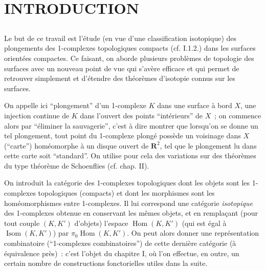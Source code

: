 

\chapter*{INTRODUCTION}
\section*{}

Le but de ce travail est l'étude (en vue d'une classification isotopique) des plongements des 1-complexes topologiques compacts (cf. I.1.2.) dans les surfaces orientées compactes. Ce faisant, on aborde plusieurs problèmes de topologie des surfaces avec un nouveau point de vue qui s'avère efficace et qui permet de retrouver simplement et d'étendre des théorèmes d'isotopie connus sur les surfaces.

On appelle ici ``plongement'' d'un 1-complexe $K$ dans une surface à bord $X$, une injection continue de $K$ dans l'ouvert des points ``intérieurs'' de $X$~; on commence alors par ``éliminer la sauvagerie'', c'est à dire montrer que lorsqu'on se donne un tel plongement, tout point du 1-complexe plongé possède un voisinage dans $X$ (``carte'') homéomorphe à un disque ouvert de $\mathbf{R}^2$, tel que le plongement lu dans cette carte soit ``standard''. On utilise pour cela des variations sur des théorèmes du type théorème de Schoenflies (cf. chap. II).

On introduit la catégorie des 1-complexes topologiques dont les objets sont les 1-complexes topologiques (compacts) et dont les morphismes sont les homéomorphismes entre 1-complexes. Il lui correspond une catégorie \emph{isotopique} des 1-complexes obtenue en conservant les mêmes objets, et en remplaçant (pour tout couple $(K,K')$ d'objets) l'espace $\operatorname{Hom}(K,K')$ (qui est égal à $\operatorname{Isom}(K,K')$) par $\pi_0 \operatorname{Hom}(K,K')$. On peut alors donner une représentation combinatoire (``1-complexes combinatoires'') de cette dernière catégorie (à équivalence près)~: c'est l'objet du chapitre I, où l'on effectue, en outre, un certain nombre de constructions fonctorielles utiles dans la suite.

